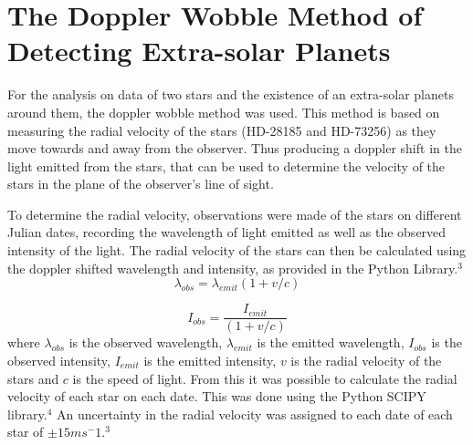 \documentclass[]{article}
\begin{document}
\section*{The Doppler Wobble Method of Detecting Extra-solar Planets}
\par
For the analysis on data of two stars and the existence of an extra-solar planets 
around them, the doppler wobble method was used. This method is based on measuring the 
radial velocity of the stars (HD-28185 and HD-73256) as they move towards and away from 
the observer. Thus
producing a doppler shift in the light emitted from the stars, that can be used to 
determine the velocity of the stars in the plane of the observer's line of sight. 
\par
To determine the radial velocity, observations were made of the stars on different
Julian dates, recording the wavelength of light emitted as well as the observed intensity 
of the light. The radial velocity of the stars can then be calculated using the doppler
shifted wavelength and intensity, as provided in the Python Library.$^3$ 
\begin{equation}\label{eq:wavelength doppler}\lambda_{obs} = \lambda_{emit}{(1+v/c)}
\end{equation}

\begin{equation}\label{eq:intensity doppler}I_{obs} = \frac{I_{emit}}{(1+v/c)}
\end{equation}
where $\lambda_{obs}$ is the observed wavelength, $\lambda_{emit}$ is the 
emitted wavelength, $I_{obs}$ is the observed intensity, $I_{emit}$ is the emitted 
intensity, $v$ is the radial velocity of the stars and $c$ is the speed of light.
From this it was possible to calculate the radial velocity of each star on each date.
This was done using the Python SCIPY library.$^4$ An uncertainty in the radial velocity
was assigned to each date of each star of $\pm 15 ms^-1$.$^3$
\par
\end{document}

